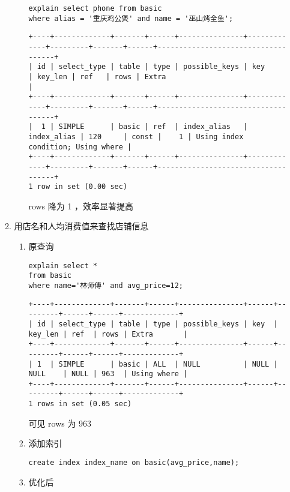 \documentclass[11pt]{article}
\begin{document}
\begin{itemize}
\begin{enumerate}
\begin{enumerate}
\begin{lstlisting}
explain select phone from basic
where alias = '重庆鸡公煲' and name = '巫山烤全鱼';
\end{lstlisting}

\begin{verbatim}
+----+-------------+-------+------+---------------+-------------+---------+-------+------+------------------------------------+
| id | select_type | table | type | possible_keys | key         | key_len | ref   | rows | Extra                              |
+----+-------------+-------+------+---------------+-------------+---------+-------+------+------------------------------------+
|  1 | SIMPLE      | basic | ref  | index_alias   | index_alias | 120     | const |    1 | Using index condition; Using where |
+----+-------------+-------+------+---------------+-------------+---------+-------+------+------------------------------------+
1 row in set (0.00 sec)
\end{verbatim}

rows 降为 1 ，效率显著提高
\end{enumerate}

\item 用店名和人均消费值来查找店铺信息
\begin{enumerate}
\item 原查询

\begin{lstlisting}
explain select *
from basic
where name='林师傅' and avg_price=12;
\end{lstlisting}

\begin{verbatim}
+----+-------------+-------+------+---------------+------+---------+------+------+-------------+
| id | select_type | table | type | possible_keys | key  | key_len | ref  | rows | Extra       |
+----+-------------+-------+------+---------------+------+---------+------+------+-------------+
| 1  | SIMPLE      | basic | ALL  | NULL          | NULL | NULL    | NULL | 963  | Using where |
+----+-------------+-------+------+---------------+------+---------+------+------+-------------+
1 rows in set (0.05 sec)
\end{verbatim}

可见 rows 为 963
\item 添加索引

\begin{lstlisting}
create index index_name on basic(avg_price,name);
\end{lstlisting}
\item 优化后


\end{enumerate}
\end{enumerate}
\end{itemize}
\end{document}
